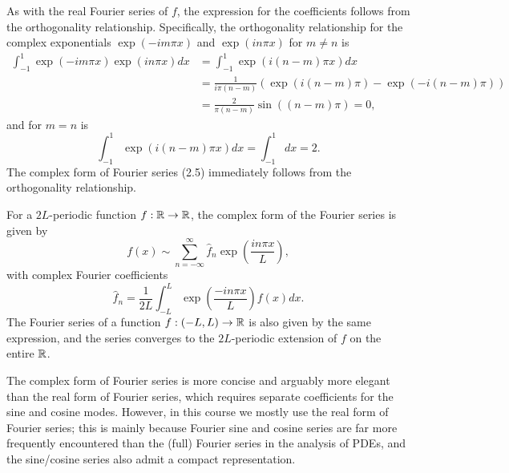As with the real Fourier series of $f$, the expression for the coefficients follows from the orthogonality relationship. Specifically, the orthogonality relationship for the complex exponentials $\exp(-im\pi x)$ and $\exp(in\pi x)$ for $m \neq n$ is
\begin{align*}
    \int_{-1}^{1} \exp(-im\pi x) \exp(in\pi x) dx &= \int_{-1}^{1} \exp(i(n - m)\pi x) dx \\
    &= \frac{1}{i\pi(n - m)} \left(\exp(i(n - m)\pi) - \exp(-i(n - m)\pi)\right) \\
    &= \frac{2}{\pi(n - m)} \sin((n - m)\pi) = 0,
\end{align*}
and for $m = n$ is
\[\int_{-1}^{1} \exp(i(n - m)\pi x) dx = \int_{-1}^{1} dx = 2.\]
The complex form of Fourier series (2.5) immediately follows from the orthogonality relationship.

For a $2L$-periodic function $f : \mathbb{R} \to \mathbb{R}$, the complex form of the Fourier series is given by
\[f(x) \sim \sum_{n=-\infty}^{\infty} \hat{f}_n \exp\left(\frac{in\pi x}{L}\right),\]
with complex Fourier coefficients
\[\hat{f}_n = \frac{1}{2L} \int_{-L}^{L} \exp\left(\frac{-in\pi x}{L}\right) f(x) dx.\]
The Fourier series of a function $f : (-L, L) \to \mathbb{R}$ is also given by the same expression, and the series converges to the $2L$-periodic extension of $f$ on the entire $\mathbb{R}$.

The complex form of Fourier series is more concise and arguably more elegant than the real form of Fourier series, which requires separate coefficients for the sine and cosine modes. However, in this course we mostly use the real form of Fourier series; this is mainly because Fourier sine and cosine series are far more frequently encountered than the (full) Fourier series in the analysis of PDEs, and the sine/cosine series also admit a compact representation.

